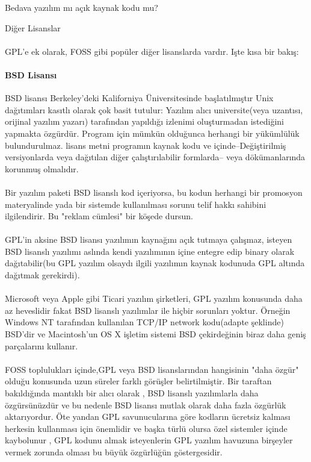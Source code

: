 \documentclass[10pt,a5paper]{book}
\begin{document}
\begin{section}{Bedava yazılım mı açık kaynak kodu mu?}
\begin{subsection}{Diğer Lisanslar}
\paragraph{}{GPL'e ek olarak, FOSS gibi popüler diğer lisanslarda vardır. Işte kısa bir bakış:}
\paragraph{BSD Lisansı}{BSD lisansı Berkeley'deki Kaliforniya Üniversitesinde başlatılmıştır Unix dağıtımları kasıtlı olarak çok basit tutulur: Yazılım alıcı universite(veya uzantısı, orijinal yazılım yazarı)  tarafından yapıldığı izlenimi oluşturmadan istediğini yapmakta özgürdür. Program için mümkün olduğunca herhangi bir yükümlülük bulundurulmaz. lisans metni programın kaynak kodu ve içinde--Değiştirilmiş versiyonlarda veya dağıtılan diğer çalıştırılabilir formlarda-- veya dökümanlarında korunmuş olmalıdır.}
\paragraph{}{Bir yazılım paketi BSD lisanslı kod içeriyorsa, bu kodun herhangi bir promosyon materyalinde yada bir sistemde kullanılması sorunu  telif hakkı sahibini ilgilendirir. Bu "reklam cümlesi" bir köşede dursun.}
\paragraph{}{GPL'in aksine BSD lisansı yazılımın kaynağını açık tutmaya çalışmaz, isteyen  BSD lisanslı yazılımı aslında kendi yazılımının içine entegre edip binary olarak dağıtabilir(bu GPL yazılım olsaydı ilgili yazılımın kaynak kodunuda GPL altında dağıtmak gerekirdi).}
\paragraph{}{Microsoft veya Apple gibi Ticari yazılım şirketleri, GPL yazılım konusunda daha az heveslidir fakat BSD lisanslı yazılımlar  ile hiçbir sorunları yoktur. Örneğin Windows NT tarafından kullanılan TCP/IP   network kodu(adapte şeklinde)  BSD'dir ve Macintosh'un OS X işletim sistemi BSD çekirdeğinin biraz daha geniş parçalarını kullanır.}
\paragraph{}{FOSS toplulukları içinde,GPL veya BSD lisanslarından hangisinin "daha özgür" olduğu konusunda uzun süreler farklı görüşler belirtilmiştir. Bir taraftan bakıldığında mantıklı bir alıcı olarak , BSD lisanslı yazılımlarla daha özgürsünüzdür ve bu nedenle BSD lisansı mutlak olarak daha fazla özgürlük aktarıyordur. Öte yandan GPL savunucularına göre kodların ücretsiz kalması herkesin kullanması için önemlidir ve başka türlü olursa özel sistemler içinde kaybolunur , GPL kodunu almak isteyenlerin GPL yazılım havuzuna birşeyler vermek zorunda olması bu büyük özgürlüğün göstergesidir.}

\end{subsection}
\end{section}
\end{document}

